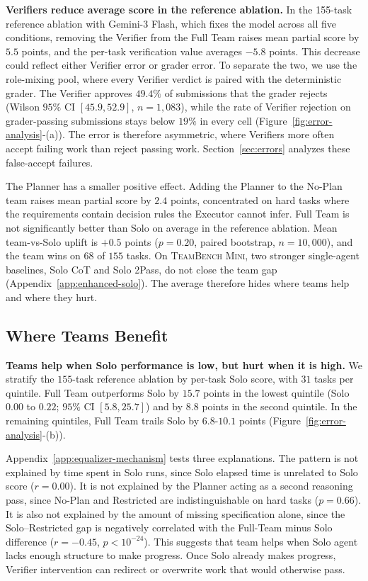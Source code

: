 \documentclass{article}
\begin{document}
\textbf{Verifiers reduce average score in the reference ablation.} In the 155-task reference ablation with Gemini-3 Flash, which fixes the model across all five conditions, removing the Verifier from the Full Team raises mean partial score by $5.5$ points, and the per-task verification value averages
$-5.8$ points. This decrease could reflect either Verifier error or grader error. To separate the two, we use the role-mixing pool, where every Verifier verdict is paired with the deterministic grader. The Verifier approves $49.4\%$ of submissions
that the grader rejects (Wilson $95\%$ CI $[45.9, 52.9]$, $n=1{,}083$), while the
rate of Verifier rejection on grader-passing submissions stays below $19\%$ in every cell (Figure~\ref{fig:error-analysis}-(a)). The error is therefore asymmetric, where
Verifiers more often accept failing work than reject passing work. Section~\ref{sec:errors}
analyzes these false-accept failures.

The Planner has a smaller positive effect. Adding the Planner to the No-Plan team raises mean partial score by $2.4$ points, concentrated on hard tasks where the requirements contain decision rules the Executor cannot infer. Full Team is not significantly better than Solo on average in the reference ablation. Mean team-vs-Solo
uplift is $+0.5$ points ($p=0.20$, paired bootstrap, $n=10{,}000$), and the team wins on $68$ of $155$ tasks. On \textsc{TeamBench Mini}, two stronger single-agent baselines, Solo CoT and Solo 2Pass, do not close the team gap (Appendix~\ref{app:enhanced-solo}). The average therefore hides where teams help and where they hurt.

\subsection{Where Teams Benefit}
\label{sec:capability}

\textbf{Teams help when Solo performance is low, but hurt when it is high.} We stratify the $155$-task reference ablation by per-task Solo score, with $31$
tasks per quintile. Full Team outperforms Solo by $15.7$ points in the lowest
quintile (Solo $0.00$ to $0.22$; $95\%$ CI $[5.8, 25.7]$) and by $8.8$ points
in the second quintile. In the remaining quintiles, Full Team trails Solo by
$6.8$-$10.1$ points (Figure~\ref{fig:error-analysis}-(b)).

Appendix~\ref{app:equalizer-mechanism} tests three explanations. The
pattern is not explained by time spent in Solo runs, since Solo elapsed time is
unrelated to Solo score ($r=0.00$). It is not explained by the Planner acting as a
second reasoning pass, since No-Plan and Restricted are indistinguishable on hard
tasks ($p=0.66$). It is also not explained by the amount of missing specification
alone, since the Solo--Restricted gap is negatively correlated with the Full-Team
minus Solo difference ($r=-0.45$, $p<10^{-24}$). This suggests that
team helps when Solo agent lacks enough structure to make progress. Once
Solo already makes progress, Verifier intervention can redirect or overwrite work
that would otherwise pass.
\end{document}
